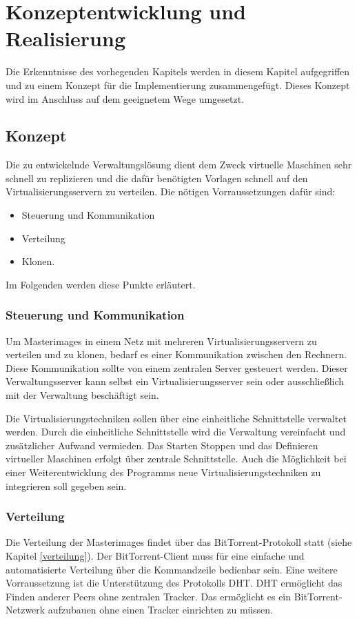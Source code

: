 \chapter{Konzeptentwicklung und Realisierung}
Die Erkenntnisse des vorhegenden Kapitels werden in diesem Kapitel aufgegriffen und zu einem Konzept für die Implementierung zusammengefügt. Dieses Konzept wird im Anschluss auf dem geeignetem Wege umgesetzt.
\section{Konzept}
Die zu entwickelnde Verwaltungslösung dient dem Zweck virtuelle Maschinen sehr schnell zu replizieren und die dafür benötigten Vorlagen schnell auf den Virtualisierungsservern zu verteilen. Die nötigen Vorraussetzungen dafür sind:
\begin{itemize}
\item{Steuerung und Kommunikation}
\item{Verteilung}
\item{Klonen.}
\end{itemize}
Im Folgenden werden diese Punkte erläutert.

\subsection{Steuerung und Kommunikation}
Um Masterimages in einem Netz mit mehreren Virtualisierungsservern zu verteilen und zu klonen, bedarf es einer Kommunikation zwischen den Rechnern. Diese Kommunikation sollte von einem zentralen Server gesteuert werden. Dieser Verwaltungsserver kann selbst ein Virtualisierungsserver sein oder ausschließlich mit der Verwaltung beschäftigt sein.

Die Virtualisierungstechniken sollen über eine einheitliche Schnittstelle verwaltet werden. Durch die einheitliche Schnittstelle wird die Verwaltung vereinfacht und zusätzlicher Aufwand vermieden. Das Starten Stoppen und das Definieren virtueller Maschinen erfolgt über zentrale Schnittstelle. Auch die Möglichkeit bei einer Weiterentwicklung des Programms neue Virtualisierungstechniken zu integrieren soll gegeben sein.

\subsection{Verteilung}
Die Verteilung der Masterimages findet über das BitTorrent-Protokoll statt (siehe Kapitel \ref{verteilung}). Der BitTorrent-Client muss für eine einfache und automatisierte Verteilung über die Kommandzeile bedienbar sein. Eine weitere Vorraussetzung ist die Unterstützung des Protokolls DHT. DHT ermöglicht das Finden anderer Peers ohne zentralen Tracker. Das ermöglicht es ein BitTorrent-Netzwerk aufzubauen ohne einen Tracker einrichten zu müssen.


